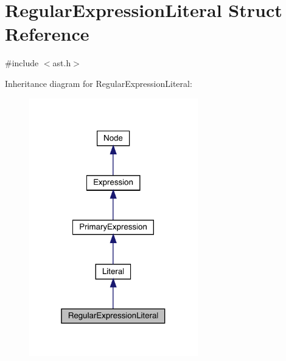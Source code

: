 \hypertarget{struct_regular_expression_literal}{}\section{Regular\+Expression\+Literal Struct Reference}
\label{struct_regular_expression_literal}


{\ttfamily \#include $<$ast.\+h$>$}



Inheritance diagram for Regular\+Expression\+Literal\+:\nopagebreak
\begin{figure}[H]
\begin{center}
\leavevmode
\includegraphics[width=208pt]{struct_regular_expression_literal__inherit__graph}
\end{center}
\end{figure}


